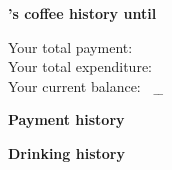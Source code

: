 \documentclass[10pt]{article}
\newcommand{\moneycolor}[1]{
\IfBeginWith{#1}{-}
{{\color{red}#1}}
{{\color{green}#1}}
}
\begin{document}
\pagestyle{empty}


{ 
\begin{center}
 \Large{\textbf{\n 's coffee history until \currenttime}}\\
\end{center}
\vspace{0.5cm}
 Your total payment:~~~~  \p\EUR\\
 Your total expenditure: \e\EUR\\
 Your current balance:~~ \moneycolor{\b}\EUR
}

\vspace{1cm}
\begin{center}
{\large\textbf{Payment history}}\\
\end{center}
\vfill
\begin{center}
{\large\textbf{Drinking history}}\\
\end{center}
\end{document}
